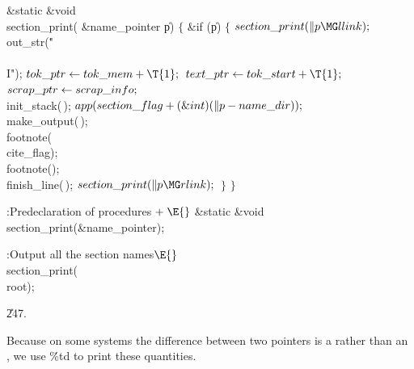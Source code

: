 \Y\B\1\1\&{static} \&{void} \\{section\_print}(\6
\&{name\_pointer} \|p)\2\2\6
${}\{{}$\1\6
\&{if} (\|p)\5
${}\{{}$\1\6
${}\\{section\_print}(\|p\MG\\{llink});{}$\6
\\{out\_str}(\.{"\\\\I"});\6
${}\\{tok\_ptr}\K\\{tok\_mem}+\T{1};{}$\6
${}\\{text\_ptr}\K\\{tok\_start}+\T{1};{}$\6
${}\\{scrap\_ptr}\leftarrow\\{scrap\_info};{}$\6
\\{init\_stack}(\,);\6
${}\\{app}(\\{section\_flag}+(\&{int})(\|p-\\{name\_dir}));{}$\6
\\{make\_output}(\,);\6
\\{footnote}(\\{cite\_flag});\6
\\{footnote}();\6
\\{finish\_line}(\,);\6
${}\\{section\_print}(\|p\MG\\{rlink});{}$\6
\4${}\}{}$\2\6
\4${}\}{}$\2\par
\fi

\B{}:Predeclaration of procedures\X${}\mathrel+\E{}$\5
\&{static} \&{void} \\{section\_print}(\&{name\_pointer});\par
\fi

\B{}:Output all the section names\X${}\E{}$\6
\\{section\_print}(\\{root});\par
\U247.\fi

Because on some systems the difference between two pointers is a 
rather than an , we use \.{\%td} to print these quantities.

